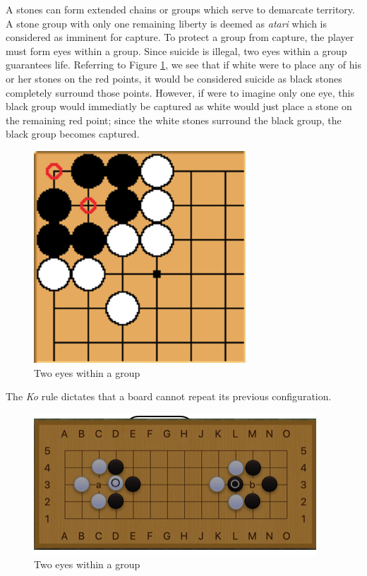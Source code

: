 \documentclass[11pt]{article}
\begin{document}
A stones can form extended chains or groups which serve to demarcate territory. A stone group with only one remaining liberty is deemed as \textit{atari} which is considered as imminent for capture. To protect a group from capture, the player must form eyes within a group. Since suicide is illegal, two eyes within a group guarantees life. Referring to Figure \ref{fig:eyes1}, we see that if white were to place any of his or her stones on the red points, it would be considered suicide as black stones completely surround those points. However, if were to imagine only one eye, this black group would immediatly be captured as white would just place a stone on the remaining red point; since the white stones surround the black group, the black group becomes captured.
\begin{figure}[ht]
  \centering
  \includegraphics[scale=0.75]{eyes1.png}
  \caption{Two eyes within a group}
  \label{fig:eyes1}
\end{figure}

The \textit{Ko} rule dictates that a board cannot repeat its previous configuration.

\begin{figure}[ht]
  \centering
  \includegraphics[scale=0.75]{ko1.png}
  \caption{Two eyes within a group}
  \label{fig:ko1}
\end{figure}
\end{document}
